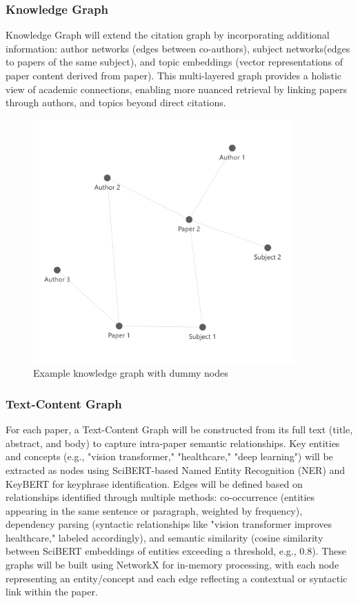 \documentclass[a4paper,12pt]{article}
\begin{document}
\subsubsection{Knowledge Graph}
Knowledge Graph will extend the citation graph by incorporating additional
information: author networks (edges between co-authors), subject networks(edges
to papers of the same subject), and topic embeddings (vector representations of
paper content derived from paper). This multi-layered graph provides a holistic
view of academic connections, enabling more nuanced retrieval by linking papers
through authors, and topics beyond direct citations.
\begin{figure}[H]
    \centering
    \includegraphics[width=10cm]{knowledgegraph.png}
    \caption{Example knowledge graph with dummy nodes}
\end{figure}

\subsubsection{Text-Content Graph}
For each paper, a Text-Content Graph will be constructed from its full text
(title, abstract, and body) to capture intra-paper semantic relationships. Key
entities and concepts (e.g., "vision transformer," "healthcare," "deep learning")
will be extracted as nodes using SciBERT-based Named Entity Recognition (NER)
\parencite{beltagy2019scibertpretrainedlanguagemodel} and KeyBERT \parencite{10295108}
for keyphrase identification. Edges will be defined based on relationships
identified through multiple methods: co-occurrence (entities appearing in the
same sentence or paragraph, weighted by frequency), dependency parsing
(syntactic relationships like "vision transformer improves healthcare,"
labeled accordingly), and semantic similarity (cosine similarity between
SciBERT embeddings of entities exceeding a threshold, e.g., 0.8). These
graphs will be built using NetworkX for in-memory processing, with each node
representing an entity/concept and each edge reflecting a contextual or syntactic
link within the paper.
\end{document}
